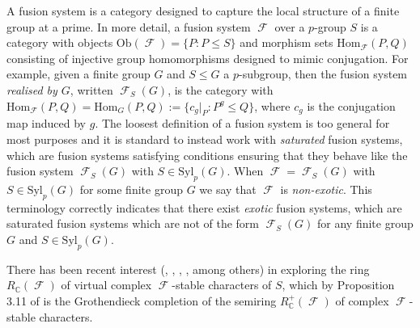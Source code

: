 \documentclass[12pt]{article}
\DeclareMathOperator{\C}{\mathbb{C}}
\DeclareMathOperator{\sF}{\mathcal{F}}
\theoremstyle{plain}
\theoremstyle{definition}
\begin{document}
\normalsize
A fusion system is a category designed to capture the local structure of a finite group at a prime. In more detail, a fusion system $\sF$ over a $p$-group $S$ is a category with objects $\text{Ob}(\sF) = \{P \colon P \leq S\}$ and morphism sets $\mathrm{Hom}_{\sF}(P, Q)$ consisting of injective group homomorphisms designed to mimic conjugation. For example, given a finite group $G$ and $S \leq G$ a $p$-subgroup, then the fusion system \emph{realised by $G$}, written $\sF_S(G)$, is the category with $\mathrm{Hom}_{\sF}(P, Q) = \mathrm{Hom}_G(P,Q) := \{c_g|_P \colon P^g \leq Q\}$, where $c_g$ is the conjugation map induced by $g$. The loosest definition of a fusion system is too general for most purposes and it is standard to instead work with \emph{saturated} fusion systems, which are fusion systems satisfying conditions ensuring that they behave like the fusion system $\sF_S(G)$ with $S \in \text{Syl}_p(G)$. When $\sF = \sF_S(G)$ with $S \in \text{Syl}_p(G)$ for some finite group $G$ we say that $\sF$ is \emph{non-exotic}. This terminology correctly indicates that there exist \emph{exotic} fusion systems, which are saturated fusion systems which are not of the form $\sF_S(G)$ for any finite group $G$ and $S \in \text{Syl}_p(G)$.

There has been recent interest (\cite{completion theorem}, \cite{unique factorisation}, \cite{symmetric groups}, \cite{sambale}, among others) in exploring the ring $R_{\C}(\sF)$ of virtual complex $\sF$-stable characters of $S$, which by Proposition 3.11 of \cite{aycin thesis} is the Grothendieck completion of the semiring $R_{\C}^+(\sF)$ of complex $\sF$-stable characters. 
\end{document}
